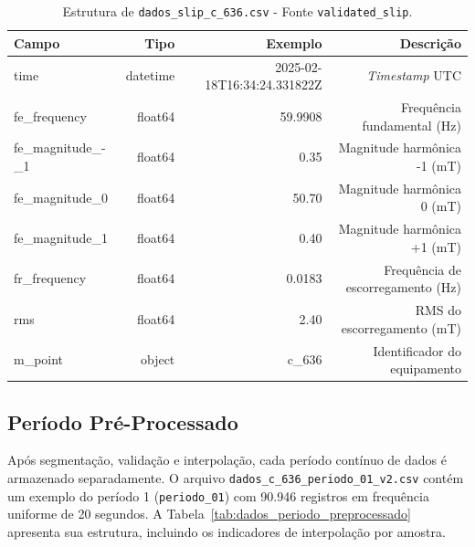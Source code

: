 \begin{table}[H]
  \centering
  \small
  \begin{tabular}{|l|r|r|r|}
    \hline
    \textbf{Campo}      & \textbf{Tipo} & \textbf{Exemplo}            & \textbf{Descrição}                \\
    \hline
    time                & datetime      & 2025-02-18T16:34:24.331822Z & \textit{Timestamp} UTC            \\
    fe\_frequency       & float64       & 59.9908                     & Frequência fundamental (Hz)       \\
    fe\_magnitude\_-\_1 & float64       & 0.35                        & Magnitude harmônica -1 (mT)       \\
    fe\_magnitude\_0    & float64       & 50.70                       & Magnitude harmônica 0 (mT)        \\
    fe\_magnitude\_1    & float64       & 0.40                        & Magnitude harmônica +1 (mT)       \\
    fr\_frequency       & float64       & 0.0183                      & Frequência de escorregamento (Hz) \\
    rms                 & float64       & 2.40                        & RMS do escorregamento (mT)        \\
    m\_point            & object        & c\_636                      & Identificador do equipamento      \\
    \hline
  \end{tabular}
  \caption{Estrutura de \texttt{dados\_slip\_c\_636.csv} - Fonte \texttt{validated\_slip}.}
  \label{tab:dados_raw_slip}
\end{table}

\subsection{Período Pré-Processado}

Após segmentação, validação e interpolação, cada período contínuo de dados é armazenado separadamente. O arquivo \texttt{dados\_c\_636\_periodo\_01\_v2.csv} contém um exemplo do período 1 (\texttt{periodo\_01}) com 90.946 registros em frequência uniforme de 20 segundos. A Tabela~\ref{tab:dados_periodo_preprocessado} apresenta sua estrutura, incluindo os indicadores de interpolação por amostra.

